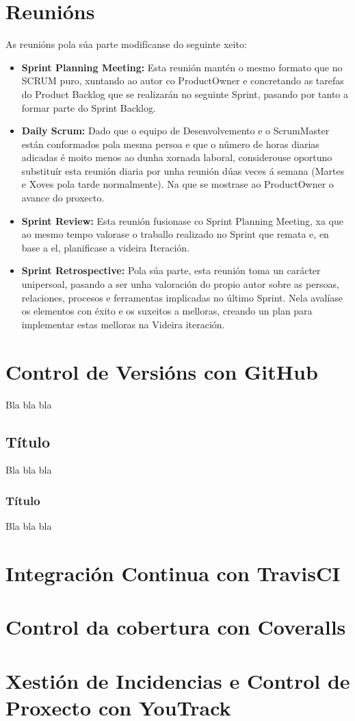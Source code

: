 \section{Reunións}
As reunións pola súa parte modifícanse do seguinte xeito:

\begin{itemize}
	\item{\textbf{Sprint Planning Meeting:}}
	Esta reunión mantén o mesmo formato que no SCRUM puro, xuntando ao autor co	ProductOwner 
	e concretando as tarefas do Product Backlog que se realizarán no seguinte Sprint, pasando
	por tanto a formar parte do Sprint Backlog.
	
	\item{\textbf{Daily Scrum:}}
	Dado que o equipo de Desenvolvemento e o ScrumMaster están conformados pola mesma persoa
	e que o número de horas diarias adicadas é moito menos ao dunha xornada laboral, considerouse
	oportuno substituír esta reunión diaria por unha reunión dúas veces á semana (Martes e Xoves 
	pola tarde normalmente). Na que se mostrase ao ProductOwner o avance do proxecto.
	
	\item{\textbf{Sprint Review:}}
	Esta reunión fusionase co Sprint Planning Meeting, xa que ao mesmo tempo valorase o traballo
	realizado no Sprint que remata e, en base a el, planificase a videira Iteración. 
	
	\item{\textbf{Sprint Retrospective:}}
	Pola súa parte, esta reunión toma un carácter unipersoal, pasando a ser unha valoración do
	propio autor sobre as persoas, relaciones, procesos e ferramentas implicadas no último Sprint.
	Nela avalíase os elementos con éxito e os suxeitos a melloras, creando un plan para implementar
	estas melloras na Videira iteración.
	
\end{itemize}


\section{Control de Versións con GitHub}

  Bla bla bla

  \subsection{Título}

  Bla bla bla

  \subsubsection{Título}

  Bla bla bla

\section{Integración Continua con TravisCI}
\section{Control da cobertura con Coveralls}
\section{Xestión de Incidencias e Control de Proxecto con YouTrack}
